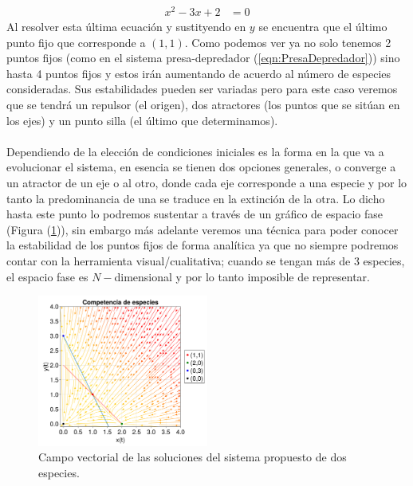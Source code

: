\begin{ejemplo}
\begin{align*}
		x^2-3x+2 &= 0
	\end{align*}
	Al resolver esta última ecuación y sustityendo en $y$ se encuentra que el último punto fijo que corresponde a $(1,1)$. Como podemos ver ya no solo tenemos 2 puntos fijos (como en el sistema presa-depredador (\ref{eqn:PresaDepredador})) sino hasta 4 puntos fijos y estos irán aumentando de acuerdo al número de especies consideradas. Sus estabilidades pueden ser variadas pero para este caso  veremos que se tendrá un repulsor (el origen), dos atractores (los puntos que se sitúan en los ejes) y un punto silla (el último que determinamos). 
	\\
	\\
	Dependiendo de la elección de condiciones iniciales es la forma en la que va a evolucionar el sistema, en esencia se tienen dos opciones generales, o converge a un atractor de un eje o al otro, donde cada eje corresponde a una especie y por lo tanto la predominancia de una se traduce en la extinción de la otra. Lo dicho hasta este punto lo podremos sustentar a través de un gráfico de espacio fase (Figura (\ref{fig:CompetenciaEspecies})), sin embargo más adelante veremos una técnica para poder conocer la estabilidad de los puntos fijos de forma analítica ya que no siempre podremos contar con la herramienta visual/cualitativa; cuando se tengan más de 3 especies, el espacio fase es $N-$dimensional y por lo tanto imposible de representar.
	\newpage
	
\end{ejemplo}\label{eg:2x2}
\begin{figure} \vspace{-30pt} \begin{center}
		\includegraphics[width=0.5\textwidth]{../Imagenes/Competencia de especies} 
	\end{center} 
	\vspace{-20pt} 
	\caption{Campo vectorial de las soluciones del sistema propuesto de dos especies.} 
	\vspace{-10pt}
	\label{fig:CompetenciaEspecies}
\end{figure} 
